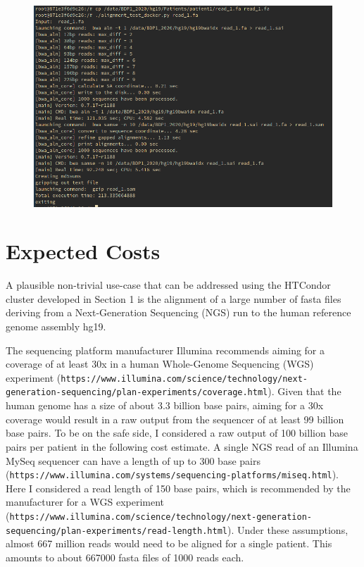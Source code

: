 \documentclass{article}
\begin{document}
\begin{figure}[!h]
    \center
    \includegraphics[width=\textwidth]{./images/docker_test_out.png}
\end{figure}

\FloatBarrier

\section{Expected Costs}
A plausible non-trivial use-case that can be addressed using the HTCondor cluster developed in Section 1 is the alignment of a large number of fasta files deriving from a Next-Generation Sequencing (NGS) run to the human reference genome assembly hg19.

The sequencing platform manufacturer Illumina recommends aiming for a coverage of at least 30x in a human Whole-Genome Sequencing (WGS) experiment (\texttt{https://www.illumina.com/science/technology/next-generation-sequencing/plan-experiments/coverage.html}).
Given that the human genome has a size of about 3.3 billion base pairs, aiming for a 30x coverage would result in a raw output from the sequencer of at least 99 billion base pairs.
To be on the safe side, I considered a raw output of 100 billion base pairs per patient in the following cost estimate.
A single NGS read of an Illumina MySeq sequencer can have a length of up to 300 base pairs (\texttt{https://www.illumina.com/systems/sequencing-platforms/miseq.html}). Here I considered a read length of 150 base pairs, which is recommended by the manufacturer for a WGS experiment (\texttt{https://www.illumina.com/science/technology/next-generation-sequencing/plan-experiments/read-length.html}).
Under these assumptions, almost 667 million reads would need to be aligned for a single patient.
This amounts to about 667000 fasta files of 1000 reads each.
\end{document}
